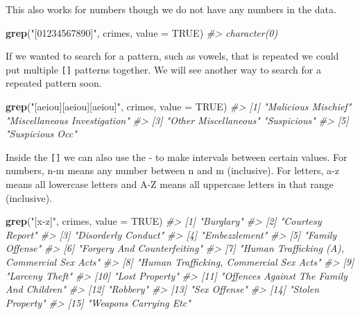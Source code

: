\documentclass[
  12pt,
]{book}
\newenvironment{Shaded}{\begin{snugshade}}{\end{snugshade}}
\newcommand{\CommentTok}[1]{\textcolor[rgb]{0.37,0.37,0.37}{\textit{#1}}}
\newcommand{\DataTypeTok}[1]{\textcolor[rgb]{0.27,0.27,0.27}{#1}}
\newcommand{\KeywordTok}[1]{\textcolor[rgb]{0.27,0.27,0.27}{\textbf{#1}}}
\newcommand{\NormalTok}[1]{#1}
\newcommand{\OtherTok}[1]{\textcolor[rgb]{0.37,0.37,0.37}{#1}}
\newcommand{\StringTok}[1]{\textcolor[rgb]{0.5,0.5,0.5}{#1}}
\begin{document}
This also works for numbers though we do not have any numbers in the data.

\begin{Shaded}
\begin{Highlighting}[]
\KeywordTok{grep}\NormalTok{(}\StringTok{"[01234567890]"}\NormalTok{, crimes, }\DataTypeTok{value =} \OtherTok{TRUE}\NormalTok{)}
\CommentTok{\#> character(0)}
\end{Highlighting}
\end{Shaded}

If we wanted to search for a pattern, such as vowels, that is repeated we could put multiple \texttt{{[}{]}} patterns together. We will see another way to search for a repeated pattern soon.

\begin{Shaded}
\begin{Highlighting}[]
\KeywordTok{grep}\NormalTok{(}\StringTok{"[aeiou][aeiou][aeiou]"}\NormalTok{, crimes, }\DataTypeTok{value =} \OtherTok{TRUE}\NormalTok{)}
\CommentTok{\#> [1] "Malicious Mischief"          "Miscellaneous Investigation"}
\CommentTok{\#> [3] "Other Miscellaneous"         "Suspicious"                 }
\CommentTok{\#> [5] "Suspicious Occ"}
\end{Highlighting}
\end{Shaded}

Inside the \texttt{{[}{]}} we can also use the - to make intervals between certain values. For numbers, n-m means any number between n and m (inclusive). For letters, a-z means all lowercase letters and A-Z means all uppercase letters in that range (inclusive).

\begin{Shaded}
\begin{Highlighting}[]
\KeywordTok{grep}\NormalTok{(}\StringTok{"[x{-}z]"}\NormalTok{, crimes, }\DataTypeTok{value =} \OtherTok{TRUE}\NormalTok{)}
\CommentTok{\#>  [1] "Burglary"                                  }
\CommentTok{\#>  [2] "Courtesy Report"                           }
\CommentTok{\#>  [3] "Disorderly Conduct"                        }
\CommentTok{\#>  [4] "Embezzlement"                              }
\CommentTok{\#>  [5] "Family Offense"                            }
\CommentTok{\#>  [6] "Forgery And Counterfeiting"                }
\CommentTok{\#>  [7] "Human Trafficking (A), Commercial Sex Acts"}
\CommentTok{\#>  [8] "Human Trafficking, Commercial Sex Acts"    }
\CommentTok{\#>  [9] "Larceny Theft"                             }
\CommentTok{\#> [10] "Lost Property"                             }
\CommentTok{\#> [11] "Offences Against The Family And Children"  }
\CommentTok{\#> [12] "Robbery"                                   }
\CommentTok{\#> [13] "Sex Offense"                               }
\CommentTok{\#> [14] "Stolen Property"                           }
\CommentTok{\#> [15] "Weapons Carrying Etc"}
\end{Highlighting}
\end{Shaded}
\end{document}
